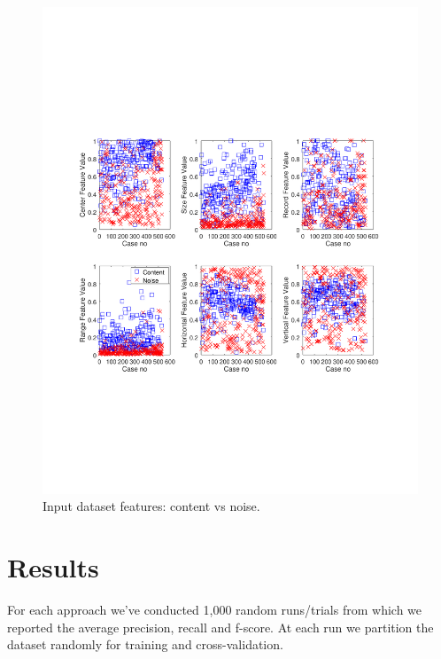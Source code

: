 \begin{figure}[h]
  \centering
     \includegraphics[trim={2.0cm 7.4cm 0.7cm 7.4cm}, clip,  width=\columnwidth]{img/dataset.pdf}
  \caption{Input dataset features: content vs noise.}
  \label{fig:dataset}
\end{figure}

\section{Results}
For each approach we've conducted 1,000 random runs/trials from which we
reported the average precision, recall and f-score. At each run we partition the
dataset randomly for training and cross-validation.

